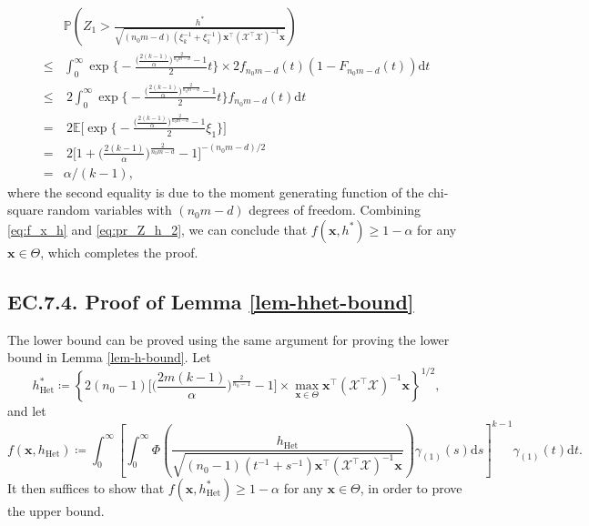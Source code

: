 \documentclass[ijoc,nonblindrev]{informs3}
\def\E{\mathbb{E}}
\def\pr{\mathbb{P}}
\def\ud{\mathrm{d}}
\def\bx{{\bm x}}
\def\cX{{\mathcal X}}
\def\hhet{h_{\mathrm{Het}}}
\begin{document}
\begin{align}
&\pr \left(Z_1 > \frac{h^*}{\sqrt{(n_0m-d) (\xi_k^{-1}+\xi_1^{-1})\bx^\intercal (\cX^\intercal \cX)^{-1} \bx}} \right) \nonumber\\
\leq & \int_0^\infty \exp\Bigg\{-\frac{\big(\frac{2(k-1)}{\alpha}\big)^{\frac{2}{n_0m-d}}-1}{2} t\Bigg\} \times 2f_{n_0m-d}(t)(1-F_{n_0m-d}(t)) \ud t \nonumber\\
\leq & \ 2 \int_0^\infty \exp\Bigg\{-\frac{\big(\frac{2(k-1)}{\alpha}\big)^{\frac{2}{n_0m-d}}-1}{2} t\Bigg\} f_{n_0m-d}(t) \ud t \nonumber\\
= & \ 2 \E \Bigg[\exp\Bigg\{-\frac{\big(\frac{2(k-1)}{\alpha}\big)^{\frac{2}{n_0m-d}}-1}{2} \xi_1 \Bigg\} \Bigg] \nonumber\\
= & \ 2 \Big[1+\big(\frac{2(k-1)}{\alpha}\big)^{\frac{2}{n_0m-d}}-1\Big]^{-(n_0m-d)/2}\nonumber\\
=& \alpha/(k-1), \label{eq:pr_Z_h_2}
\end{align}
where the second equality is due to the moment generating function of the chi-square random variables with $(n_0m-d)$ degrees of freedom.
Combining \eqref{eq:f_x_h} and \eqref{eq:pr_Z_h_2}, we can conclude that $f(\bx,h^*)\geq1-\alpha$ for any $\bx\in\Theta$, which completes the proof.
\Halmos

\vspace{5pt}
\hypertarget{EC.7.4}{
\subsection*{EC.7.4. \hspace{5pt} Proof of Lemma \ref{lem-hhet-bound}}
}

The lower bound can be proved using the same argument for proving the lower bound in Lemma \ref{lem-h-bound}.
Let
\[\hhet^* \coloneqq \left\{2(n_0-1)\Big[\big(\frac{2m(k-1)}{\alpha}\big)^{\frac{2}{n_0-1}}-1\Big] \times \max_{\bx\in\Theta} \bx^\intercal (\cX^\intercal \cX)^{-1} \bx \right\}^{1/2}, \]
and let
$$f(\bx,\hhet) \coloneqq \int_0^\infty \left[\int_0^\infty \Phi \left( \frac{\hhet}{\sqrt{(n_0-1) (t^{-1}+s^{-1})\bx^\intercal (\cX^\intercal \cX)^{-1} \bx}} \right) \gamma_{(1)}(s)\ud s \right]^{k-1} \gamma_{(1)}(t) \ud t.$$
It then suffices to show that $f(\bx,\hhet^*)\geq1-\alpha$ for any $\bx\in\Theta$, in order to prove the upper bound.
\end{document}
